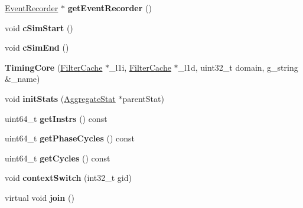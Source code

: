 \begin{DoxyCompactItemize}
\item 
\hypertarget{classTimingCore_af5ed643b8753ec8d17a85a9c20b75862}{\hyperlink{classEventRecorder}{Event\-Recorder} $\ast$ {\bfseries get\-Event\-Recorder} ()}\label{classTimingCore_af5ed643b8753ec8d17a85a9c20b75862}

\item 
\hypertarget{classTimingCore_a8bcea2d841226aaeb8106216572e6fa3}{void {\bfseries c\-Sim\-Start} ()}\label{classTimingCore_a8bcea2d841226aaeb8106216572e6fa3}

\item 
\hypertarget{classTimingCore_a0c85a00303cba302d71ea828a47c3822}{void {\bfseries c\-Sim\-End} ()}\label{classTimingCore_a0c85a00303cba302d71ea828a47c3822}

\item 
\hypertarget{classTimingCore_a9826786ed86142396e541a6d13339217}{{\bfseries Timing\-Core} (\hyperlink{classFilterCache}{Filter\-Cache} $\ast$\-\_\-l1i, \hyperlink{classFilterCache}{Filter\-Cache} $\ast$\-\_\-l1d, uint32\-\_\-t domain, g\-\_\-string \&\-\_\-name)}\label{classTimingCore_a9826786ed86142396e541a6d13339217}

\item 
\hypertarget{classTimingCore_ae4337708a106937c89f2e5a3ea31c1ce}{void {\bfseries init\-Stats} (\hyperlink{classAggregateStat}{Aggregate\-Stat} $\ast$parent\-Stat)}\label{classTimingCore_ae4337708a106937c89f2e5a3ea31c1ce}

\item 
\hypertarget{classTimingCore_a1f64d530955f36b6b58e6965f5711b3c}{uint64\-\_\-t {\bfseries get\-Instrs} () const }\label{classTimingCore_a1f64d530955f36b6b58e6965f5711b3c}

\item 
\hypertarget{classTimingCore_aaa32e933d0ff21c27cf9a60e9106b5aa}{uint64\-\_\-t {\bfseries get\-Phase\-Cycles} () const }\label{classTimingCore_aaa32e933d0ff21c27cf9a60e9106b5aa}

\item 
\hypertarget{classTimingCore_a18dafd009f0da4ba9d89c3dd68807c82}{uint64\-\_\-t {\bfseries get\-Cycles} () const }\label{classTimingCore_a18dafd009f0da4ba9d89c3dd68807c82}

\item 
\hypertarget{classTimingCore_abe9cbfc2bfa815cf16f32dca2d6746ca}{void {\bfseries context\-Switch} (int32\-\_\-t gid)}\label{classTimingCore_abe9cbfc2bfa815cf16f32dca2d6746ca}

\item 
\hypertarget{classTimingCore_ae4d653869b9bb297f062ff39023ec37d}{virtual void {\bfseries join} ()}\label{classTimingCore_ae4d653869b9bb297f062ff39023ec37d}


\end{DoxyCompactItemize}

